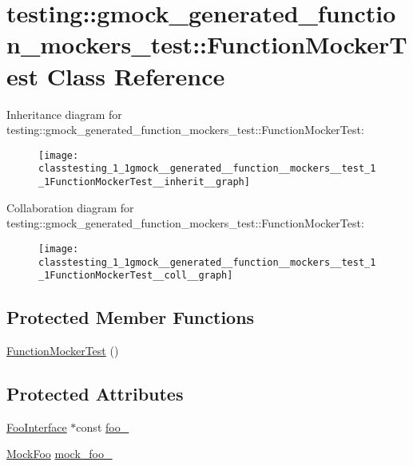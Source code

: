 \hypertarget{classtesting_1_1gmock__generated__function__mockers__test_1_1FunctionMockerTest}{}\section{testing\+:\+:gmock\+\_\+generated\+\_\+function\+\_\+mockers\+\_\+test\+:\+:Function\+Mocker\+Test Class Reference}
\label{classtesting_1_1gmock__generated__function__mockers__test_1_1FunctionMockerTest}


Inheritance diagram for testing\+:\+:gmock\+\_\+generated\+\_\+function\+\_\+mockers\+\_\+test\+:\+:Function\+Mocker\+Test\+:
\nopagebreak
\begin{figure}[H]
\begin{center}
\leavevmode
\texttt{[image: classtesting\_1\_1gmock\_\_generated\_\_function\_\_mockers\_\_test\_1\_1FunctionMockerTest\_\_inherit\_\_graph]}
\end{center}
\end{figure}


Collaboration diagram for testing\+:\+:gmock\+\_\+generated\+\_\+function\+\_\+mockers\+\_\+test\+:\+:Function\+Mocker\+Test\+:
\nopagebreak
\begin{figure}[H]
\begin{center}
\leavevmode
\texttt{[image: classtesting\_1\_1gmock\_\_generated\_\_function\_\_mockers\_\_test\_1\_1FunctionMockerTest\_\_coll\_\_graph]}
\end{center}
\end{figure}
\subsection*{Protected Member Functions}
\begin{DoxyCompactItemize}
\item 
\hyperlink{classtesting_1_1gmock__generated__function__mockers__test_1_1FunctionMockerTest_a22216ac0755e96e21c0f76068ff64f03}{Function\+Mocker\+Test} ()
\end{DoxyCompactItemize}
\subsection*{Protected Attributes}
\begin{DoxyCompactItemize}
\item 
\hyperlink{classtesting_1_1gmock__generated__function__mockers__test_1_1FooInterface}{Foo\+Interface} $\ast$const \hyperlink{classtesting_1_1gmock__generated__function__mockers__test_1_1FunctionMockerTest_ae2b8b577c4808f2dff9797168468f65f}{foo\+\_\+}
\item 
\hyperlink{classtesting_1_1gmock__generated__function__mockers__test_1_1MockFoo}{Mock\+Foo} \hyperlink{classtesting_1_1gmock__generated__function__mockers__test_1_1FunctionMockerTest_a265659f07a0e75152ab295add4769585}{mock\+\_\+foo\+\_\+}
\end{DoxyCompactItemize}
